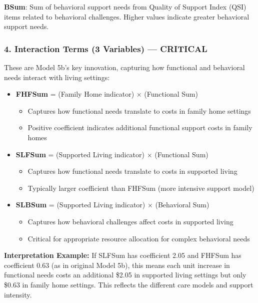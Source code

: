 \textbf{BSum}: Sum of behavioral support needs from Quality of Support Index (QSI) items related to behavioral challenges. Higher values indicate greater behavioral support needs.

\subsubsection{4. Interaction Terms (3 Variables) --- CRITICAL}

These are Model 5b's key innovation, capturing how functional and behavioral needs interact with living settings:

\begin{itemize}
    \item \textbf{FHFSum} = (Family Home indicator) × (Functional Sum)
        \begin{itemize}
            \item Captures how functional needs translate to costs in family home settings
            \item Positive coefficient indicates additional functional support costs in family homes
        \end{itemize}
    
    \item \textbf{SLFSum} = (Supported Living indicator) × (Functional Sum)
        \begin{itemize}
            \item Captures how functional needs translate to costs in supported living
            \item Typically larger coefficient than FHFSum (more intensive support model)
        \end{itemize}
    
    \item \textbf{SLBSum} = (Supported Living indicator) × (Behavioral Sum)
        \begin{itemize}
            \item Captures how behavioral challenges affect costs in supported living
            \item Critical for appropriate resource allocation for complex behavioral needs
        \end{itemize}
\end{itemize}

\textbf{Interpretation Example:} If SLFSum has coefficient 2.05 and FHFSum has coefficient 0.63 (as in original Model 5b), this means each unit increase in functional needs costs an additional \$2.05 in supported living settings but only \$0.63 in family home settings. This reflects the different care models and support intensity.

